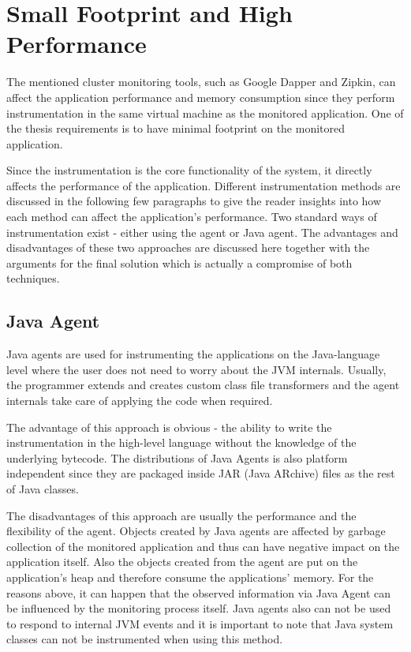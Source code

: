 \section{Small Footprint and High Performance}
The mentioned cluster monitoring tools, such as Google Dapper and Zipkin, can affect the application performance and memory consumption since they perform instrumentation in the same virtual machine as the monitored application. One of the thesis requirements is to have minimal footprint on the monitored application.

Since the instrumentation is the core functionality of the system, it directly affects the performance of the application. Different instrumentation methods are discussed in the following few paragraphs to give the reader insights into how each method can affect the application's performance. Two standard ways of instrumentation exist - either using the agent or Java agent. The advantages and disadvantages of these two approaches are discussed here together with the arguments for the final solution which is actually a compromise of both techniques.
\subsection{Java Agent}
\label{java_agent}
Java agents are used for instrumenting the applications on the Java-language level where the user does not need to worry about the JVM internals. Usually, the programmer extends and creates custom class file transformers and the agent internals take care of applying the code when required. 

The advantage of this approach is obvious - the ability to write the instrumentation in the high-level language without the knowledge of the underlying bytecode. The distributions of Java Agents is also platform independent since they are packaged inside JAR (Java ARchive) files as the rest of Java classes. 

The disadvantages of this approach are usually the performance and the flexibility of the agent. Objects created by Java agents are affected by garbage collection of the monitored application and thus can have negative impact on the application itself. Also the objects created from the agent are put on the application's heap and therefore consume the applications' memory. For the reasons above, it can happen that the observed information via Java Agent can be influenced by the monitoring process itself. Java agents also can not be used to respond to internal JVM events and it is important to note that Java system classes can not be instrumented when using this method.
